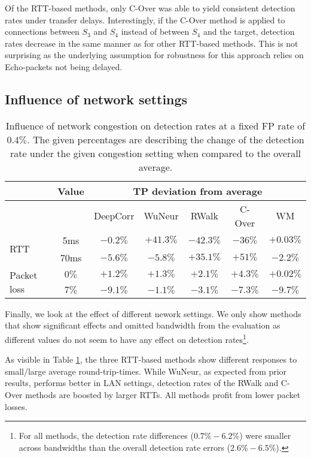 Of the RTT-based methods, only C-Over was able to yield consistent detection rates under transfer delays. 
Interestingly, if the C-Over method is applied to connections between $S_3$ and $S_4$ instead of between $S_4$ and the target, detection rates decrease in the same manner as for other RTT-based methods. This is not surprising as the underlying assumption for robustness for this approach relies on Echo-packets not being delayed.


\subsection{Influence of network settings}\label{SecN:InfluenceNetwork}

\begin{table}
\centering
\begin{tabular}{l|c|c|c|c|c|c}
& Value & \multicolumn{5}{c}{TP deviation from average}\\ \hline
 & &DeepCorr & WuNeur & RWalk& C-Over & WM \\ \hline
\multirow{2}{*}{RTT} & 5ms& $-0.2\%$ & $+41.3\%$& $-42.3\%$ & $-36\%$ & $+0.03\%$ \\ \cline{2-7}
 & 70ms & $-5.6\%$ & $-5.8\%$& $+35.1\%$ & $+51\%$& $-2.2\%$\\ \hline
\multirow{2}{*}{Packet loss} & $0\%$ & $+1.2\%$& $+1.3\%$ & $+2.1\%$ & $+4.3\%$ & $+0.02\%$\\ \cline{2-7}
 & $7\%$ & $-9.1\%$& $-1.1\%$ & $-3.1\%$ & $-7.3\%$ & $-9.7\%$\\ \hline %
\end{tabular}
\caption{Influence of network congestion on detection rates at a fixed FP rate of $0.4\%$. The given percentages are describing the change of the detection rate under the given congestion setting when compared to the overall average.}\label{tabN:Congestion}
\end{table}

Finally, we look at the effect of different nework settings. We only show methods that show significant effects and omitted bandwidth from the evaluation as different values do not seem to have any effect on detection rates\footnote{For all methods, the detection rate differences ($0.7\%-6.2\%$) were smaller across bandwidths than the overall detection rate errors ($2.6\%-6.5\%$).}.

As visible in Table \ref{tabN:Congestion}, the three RTT-based methods show different responses to small/large average round-trip-times. While WuNeur, as expected from prior results, performs better in LAN settings, detection rates of the RWalk and C-Over methods are boosted by larger RTTs. All methods profit from lower packet losses.

